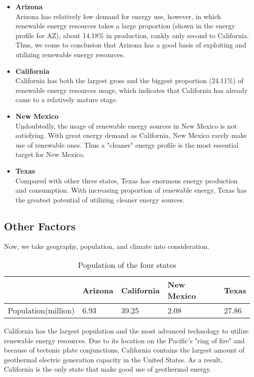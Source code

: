 \documentclass{mcmthesis}
\begin{document}
\begin{itemize}
\item \textbf{Arizona} \\
Arizona has relatively low demand for energy use, however, in which renewable energy resources takes a large proportion (shown in the energy profile for AZ), about 14.18\% in production, rankly only second to California.
Thus, we come to conclusion that Arizona has a good basis of exploiting and utilizing renewable energy resources. 
\item \textbf{California} \\
California has both the largest gross and the biggest proportion (24.11\%) of renewable energy resources usage, which indicates that California has already came to a relatively mature stage. 
\item \textbf{New Mexico} \\
Undoubtedly, the usage of renewable energy sources in New Mexico is not satisfying.
With great energy demand as California, New Mexico rarely make use of renewable ones.
Thus a "cleaner" energy profile is the most essential target for New Mexico.
\item \textbf{Texas} \\
Compared with other three states, Texas has enormous energy production and consumption.
With increasing proportion of renewable energy, Texas has the greatest potential of utilizing cleaner energy sources.
\end{itemize}

\subsection{Other Factors}

Now, we take geography, population, and climate into consideration.

\begin{table}[h]
\begin{tabularx}{\textwidth}{p{4cm}|XXXX}
& Arizona	& California & New Mexico & Texas \\ \hline
Population(million) & 6.93 & 39.25 & 2.08 & 27.86
\end{tabularx}
\caption{Population of the four states}
\label{table:name_4}
\end{table}

California has the largest population and the most advanced technology to utilize renewable energy resources.
Due to its location on the Pacific's "ring of fire" and because of tectonic plate conjunctions, California contains the largest amount of geothermal electric generation capacity in the United States.
As a result, California is the only state that make good use of geothermal energy. 
\end{document}
